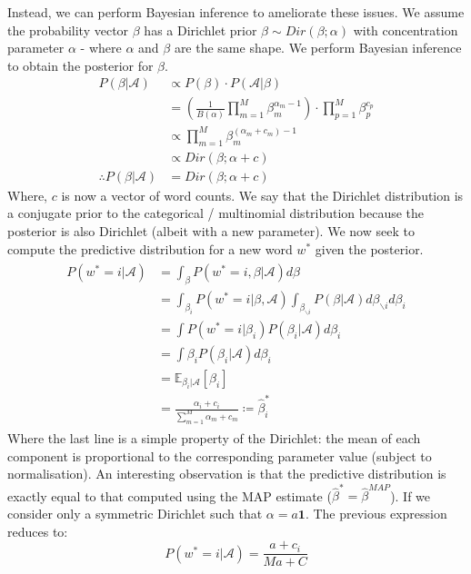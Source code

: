 \documentclass[]{article}
\newcommand{\Acal}{\mathcal{A}}
\newcommand{\Expect}{\mathbb{E}}
\begin{document}
Instead, we can perform Bayesian inference to ameliorate these issues. We assume the probability vector $\beta$ has a Dirichlet prior $\beta \sim Dir(\beta ; \alpha)$ with concentration parameter $\alpha$ - where $\alpha$ and $\beta$ are the same shape. We perform Bayesian inference to obtain the posterior for $\beta$.
%
\begin{align}
	P(\beta | \Acal) &\propto P(\beta) \cdot P(\Acal | \beta) \nonumber \\
	&= \left( \frac{1}{B(\alpha)} \prod_{m = 1}^{M} \beta_m^{\alpha_m -1} \right) \cdot \prod_{p=1}^{M} \beta_p^{c_p} \nonumber \\
	&\propto \prod_{m = 1}^{M} \beta_m^{(\alpha_m + c_m) -1} \nonumber \\
	&\propto Dir(\beta ; \alpha + c) \nonumber \\
	\therefore P(\beta | \Acal) &= Dir(\beta ; \alpha + c)
	\label{eqn:posterior}
\end{align}
%
Where, $c$ is now a vector of word counts. We say that the Dirichlet distribution is a conjugate prior to the categorical / multinomial distribution because the posterior is also Dirichlet (albeit with a new parameter). We now seek to compute the predictive distribution for a new word $w^*$ given the posterior.
%
\begin{align}
\begin{split}
	P(w^* = i | \Acal) &= \int_{\beta} P(w^* = i, \beta | \Acal) d\beta \\
	&= \int_{\beta_i} P(w^* = i | \beta , \Acal) \int_{\beta_{\backslash i}} P(\beta | \Acal) d\beta_{\backslash i} d\beta_i \\
	&= \int P(w^* = i | \beta_i) P(\beta_i | \Acal) d\beta_i \\
	&= \int \beta_i P(\beta_i | \Acal) d\beta_i \\
	&= \Expect_{\beta_i | \Acal} [\beta_i] \\
	&= \frac{\alpha_i + c_i}{\sum_{m=1}^{M} \alpha_m + c_m} \coloneqq \hat{\beta}^*_i
\end{split}
\end{align}
%
Where the last line is a simple property of the Dirichlet: the mean of each component is proportional to the corresponding parameter value (subject to normalisation). An interesting observation is that the predictive distribution is exactly equal to that computed using the MAP estimate ($\hat{\beta}^* = \hat{\beta}^{MAP}$). If we consider only a symmetric Dirichlet such that $\alpha = a \mathbf{1}$. The previous expression reduces to:
%
\begin{equation}
	P(w^* = i | \Acal) = \frac{a + c_i}{Ma + C}
	\label{eqn:pred-bayes}
\end{equation}
\end{document}
